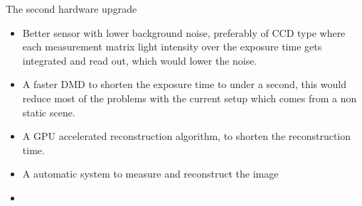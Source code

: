 The second hardware upgrade 
 

\begin{itemize}
\item Better sensor with lower background noise, preferably of CCD type where each measurement matrix light intensity over the exposure time gets integrated and read out, which would lower the noise.

\item A faster DMD to shorten the exposure time to under a second, this would reduce most of the problems with the current setup which comes from a non static scene.

\item A GPU accelerated reconstruction algorithm, to shorten the reconstruction time.

\item A automatic system to measure and reconstruct the image

\item 


\end{itemize}